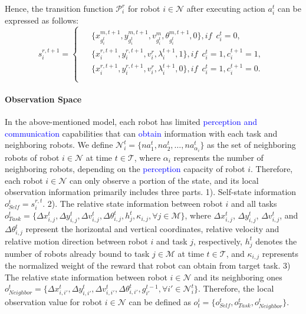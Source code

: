 \documentclass[lettersize,journal]{IEEEtran}
\newcommand{\blue}[1]{\textcolor{blue}{#1}}
\begin{document}
Hence, the transition function $\mathcal{P}_i^r$ for robot $i\in\mathcal{N}$ after executing action $a_i^t$ can be expressed as follows:
\begin{equation}
s_i^{r,t+1}=
    \begin{cases}
        \begin{aligned}
            & \{x_{g_i^t}^{m,t+1},y_{g_i^t}^{m,t+1},v_{g_i^t}^m,\theta_{g_i^t}^{m,t+1},0\},  if\enspace c_i^{t}=0,\\
            & \{x_i^{r,t+1},y_i^{r,t+1},v_i^r,\lambda_i^{t+1},1\},  if\enspace c_i^{t}=1,c_i^{t+1}=1,\\
            & \{x_i^{r,t+1},y_i^{r,t+1}, v_i^r,\lambda_i^{t+1},0\},  if\enspace   c_i^{t}=1,c_i^{t+1}=0.\\
        \end{aligned}
    \end{cases}\label{eq6}
\end{equation}

\paragraph{\textbf{Observation Space}}  In the above-mentioned model,  each robot has limited \blue{perception and communication} capabilities that can \blue{obtain} information with each task and neighboring robots. We define $\mathcal{N}_i^t=\{na_1^t,na_2^t,\ldots,na_{\alpha_i}^t\}$ as the set of neighboring robots of robot $i\in\mathcal{N}$ at time $t\in\mathcal{T}$, where $\alpha_i$ represents the number of neighboring robots, depending on the \blue{perception} capacity of robot $i$. Therefore,   each robot  $i\in \mathcal{N}$  can only observe a portion of the state, and its
  local observation information  primarily includes three parts. 1). Self-state information $o_{Self}^{t}=s_{i}^{r,t}$. 2). The relative state information between robot $i$ and all tasks $o_{Task}^t=\{\Delta x_{i,j}^t,\Delta y_{i,j}^t,\Delta v_{i,j}^t,\Delta\theta_{i,j}^t,h_j^t,\kappa_{i,j},\forall j\in\mathcal{M}\}$, where $\Delta x_{i,j}^t$, $\Delta y_{i,j}^t$, $\Delta v_{i,j}^t$, and $\Delta\theta_{i,j}^t$  represent the horizontal and vertical coordinates, relative velocity and relative motion direction between robot $i$ and task $j$, respectively, $h_{j}^{t}$ denotes the number of robots already bound to task $j\in\mathcal{M}$ at time $t\in\mathcal{T}$, and $\kappa_{i,j}$ represents the normalized weight of the reward that robot can obtain from target task. 3) The relative state information between robot $i\in\mathcal{N}$ and its neighboring ones $o_{Neighbor}^t=\{\Delta x_{i,i'}^t,\Delta y_{i,i'}^t,\Delta v_{i,i'}^t,\Delta\theta_{i,i'}^t,g_{i'}^{t-1},\forall i'\in \mathcal{N}_i^t\}$. Therefore, the local observation value for robot $i\in\mathcal{N}$ can be defined as $o_t^i=\{o_{Self}^t,o_{Task}^t,o_{Neighbor}^t\}$.
\end{document}

